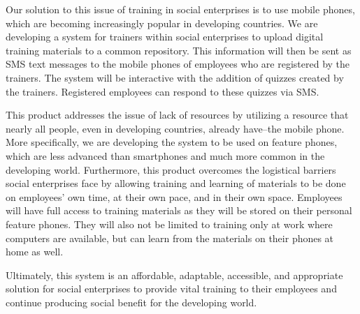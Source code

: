 Our solution to this issue of training in social enterprises is to use mobile phones, which are becoming increasingly popular in developing countries. We are developing a system for trainers within social enterprises to upload digital training materials to a common repository. This information will then be sent as SMS text messages to the mobile phones of employees who are registered by the trainers. The system will be interactive with the addition of quizzes created by the trainers. Registered employees can respond to these quizzes via SMS. 

This product addresses the issue of lack of resources by utilizing a resource that nearly all people, even in developing countries, already have--the mobile phone. More specifically, we are developing the system to be used on feature phones, which are less advanced than smartphones and much more common in the developing world. Furthermore, this product overcomes the logistical barriers social enterprises face by allowing training and learning of materials to be done on employees’ own time, at their own pace, and in their own space. Employees will have full access to training materials as they will be stored on their personal feature phones. They will also not be limited to training only at work where computers are available, but can learn from the materials on their phones at home as well. 

Ultimately, this system is an affordable, adaptable, accessible, and appropriate solution for social enterprises to provide vital training to their employees and continue producing social benefit for the developing world.
